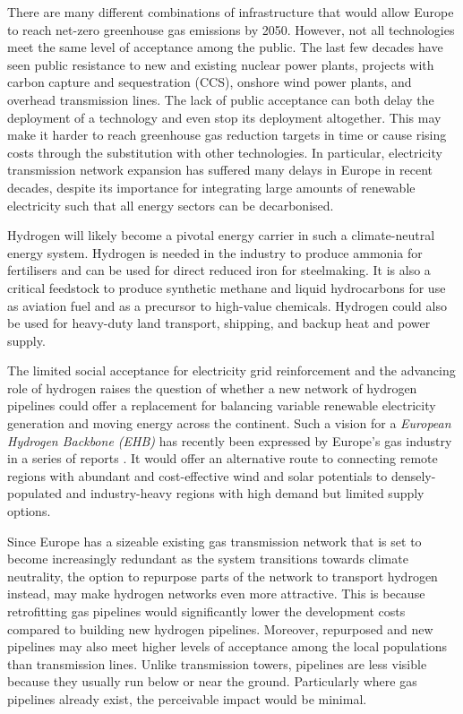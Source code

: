There are many different combinations of infrastructure that would allow Europe
to reach net-zero greenhouse gas emissions by 2050. However, not all
technologies meet the same level of acceptance among the public. The last few
decades have seen public resistance to new and existing nuclear power plants,
projects with carbon capture and sequestration (CCS), onshore wind power plants,
and overhead transmission lines. The lack of public acceptance can both delay
the deployment of a technology and even stop its deployment altogether. This may
make it harder to reach greenhouse gas reduction targets in time or cause rising
costs through the substitution with other technologies. In particular,
electricity transmission network expansion has suffered many delays in Europe in
recent decades, despite its importance for integrating large amounts of
renewable electricity such that all energy sectors can be decarbonised.

Hydrogen will likely become a pivotal energy carrier in such a climate-neutral
energy system. Hydrogen is needed in the industry to produce ammonia for
fertilisers and can be used for direct reduced iron for steelmaking. It is also
a critical feedstock to produce synthetic methane and liquid hydrocarbons for
use as aviation fuel and as a precursor to high-value chemicals. Hydrogen could
also be used for heavy-duty land transport, shipping, and backup heat
and power supply.

The limited social acceptance for electricity grid reinforcement and the
advancing role of hydrogen raises the question of whether a new network of
hydrogen pipelines could offer a replacement for balancing variable renewable
electricity generation and moving energy across the continent. Such a vision for
a \textit{European Hydrogen Backbone (EHB)} has recently been expressed by
Europe's gas industry in a series of reports
\cite{gasforclimateEuropeanHydrogen2020,gasforclimateEuropeanHydrogen2021,gasforclimateExtendingEuropean2021,gasforclimateEuropeanHydrogen2022}.
It would offer an alternative route to connecting remote regions with abundant
and cost-effective wind and solar potentials to densely-populated and
industry-heavy regions with high demand but limited supply options.

Since Europe has a sizeable existing gas transmission network that is set to
become increasingly redundant as the system transitions towards climate
neutrality, the option to repurpose parts of the network to transport hydrogen
instead, may make hydrogen networks even more attractive. This is because
retrofitting gas pipelines would significantly lower the development costs
compared to building new hydrogen pipelines. Moreover, repurposed and new
pipelines may also meet higher levels of acceptance among the local populations
than transmission lines. Unlike transmission towers, pipelines are less visible
because they usually run below or near the ground. Particularly where gas
pipelines already exist, the perceivable impact would be minimal.


